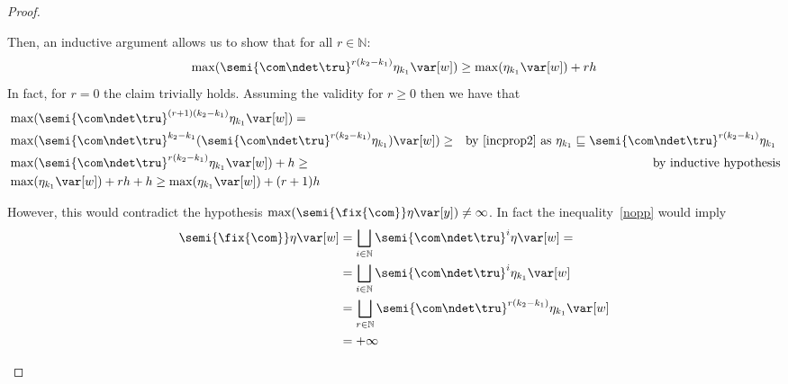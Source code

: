 \begin{proof}
\begin{inductive}
    \noindent    
    Then, an inductive argument allows us to show that for all \(r \in \mathbb{N}\):
    \begin{equation}\label{nopp}
      \max(\semi{\com \ndet \tru}^{r(k_2-k_1)} \eta_{k_1} \var[w]) \geq \max(\eta_{k_1}
      \var[w]) + r h
    \end{equation}  
    In fact, for \(r=0\) the claim trivially holds. Assuming the
    validity for \(r\geq 0\) then we have that
    \begin{align*}    
      & \max(\semi{\com \ndet \tru}^{(r+1)(k_2-k_1)} \eta_{k_1} \var[w]) =\\
      &\max(\semi{\com \ndet \tru}^{k_2-k_1} ( \semi{\com \ndet \tru}^{r(k_2-k_1)} \eta_{k_1}) \var[w]) \geq & \mbox{by~\eqref{incprop2} as \(\eta_{k_1} \sqsubseteq \semi{\com \ndet \tru}^{r(k_2-k_1)} \eta_{k_1}\) }\\
      &\max(\semi{\com \ndet \tru}^{r(k_2-k_1)} \eta_{k_1} \var[w]) + h \geq & \mbox{by inductive hypothesis}\\
      &  \max(\eta_{k_1}\var[w])  + rh + h
        \geq 
        \max(\eta_{k_1}\var[w])  + (r+1)h
    \end{align*}

    \noindent
    However, this would contradict the hypothesis
    \(\max(\semi{\fix{\com}} \eta \var[y]) \neq \infty\). In fact the
    inequality~\eqref{nopp} would imply
    \begin{align*}
      \semi{\fix{\com}} \eta \var[w]
      & = \bigsqcup_{i \in \mathbb{N}} \semi{\com
        \ndet \tru}^i \eta \var[w] =\\ 
      & =  \bigsqcup_{i \in \mathbb{N}} \semi{\com \ndet
        \tru}^i \eta_{k_1} \var[w]\\ 
      & = \bigsqcup_{r \in \mathbb{N}} \semi{\com \ndet
        \tru}^{r(k_2-k_1)} \eta_{k_1} \var[w]\\
      & = +\infty
    \end{align*}


\end{inductive}
\end{proof}

